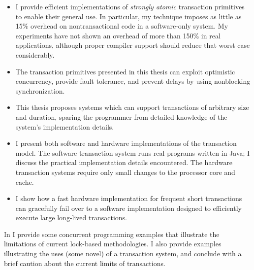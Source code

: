 \begin{itemize}
\item I provide efficient implementations of
\textit{strongly atomic} transaction primitives to enable their general use.
In particular, my technique imposes as little as 15\% overhead on
nontransactional code in a software-only system.  My experiments have
not shown an overhead of more than 150\% in real applications,
although proper compiler support should reduce that worst case
considerably.%

\item The transaction
primitives presented in this thesis can exploit optimistic
concurrency, provide fault tolerance, and prevent delays by using
nonblocking synchronization.

\item This thesis proposes systems which can support transactions of
arbitrary size and duration, sparing the programmer from detailed
knowledge of the system's implementation details.

\item I present both software and hardware implementations of the
transaction model.
The software transaction system runs real programs written in
Java; I discuss the practical implementation details encountered.
The hardware transaction systems require only small changes to the
processor core and cache.

\item I show how a fast hardware implementation for
frequent short transactions can gracefully fail over to a software
implementation designed to efficiently execute large long-lived
transactions.
\end{itemize}

In  I provide some concurrent programming
examples that illustrate the limitations of current lock-based
methodologies.  I also provide examples illustrating the uses
(some novel) of a transaction system, and conclude with a brief
caution about the current limits of transactions.

